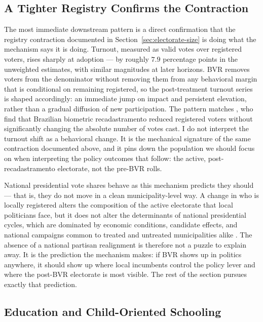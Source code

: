 \subsection{A Tighter Registry Confirms the Contraction}
\label{ssec:downstream-political}

The most immediate downstream pattern is a direct confirmation that the registry contraction documented in Section~\ref{sec:electorate-size} is doing what the mechanism says it is doing. Turnout, measured as valid votes over registered voters, rises sharply at adoption --- by roughly $7.9$ percentage points in the unweighted estimates, with similar magnitudes at later horizons. BVR removes voters from the denominator without removing them from any behavioral margin that is conditional on remaining registered, so the post-treatment turnout series is shaped accordingly: an immediate jump on impact and persistent elevation, rather than a gradual diffusion of new participation. The pattern matches \citet{forquesatoRodrigues2023}, who find that Brazilian biometric recadastramento reduced registered voters without significantly changing the absolute number of votes cast. I do not interpret the turnout shift as a behavioral change. It is the mechanical signature of the same contraction documented above, and it pins down the population we should focus on when interpreting the policy outcomes that follow: the active, post-recadastramento electorate, not the pre-BVR rolls.

National presidential vote shares behave as this mechanism predicts they should --- that is, they do not move in a clean municipality-level way. A change in who is locally registered alters the composition of the active electorate that local politicians face, but it does not alter the determinants of national presidential cycles, which are dominated by economic conditions, candidate effects, and national campaigns common to treated and untreated municipalities alike \citep{Ferrer2023HowPartisanLocal,Marx2021VoterMobilisaAnd}. The absence of a national partisan realignment is therefore not a puzzle to explain away. It is the prediction the mechanism makes: if BVR shows up in politics anywhere, it should show up where local incumbents control the policy lever and where the post-BVR electorate is most visible. The rest of the section pursues exactly that prediction.

\subsection{Education and Child-Oriented Schooling}
\label{ssec:downstream-education}

